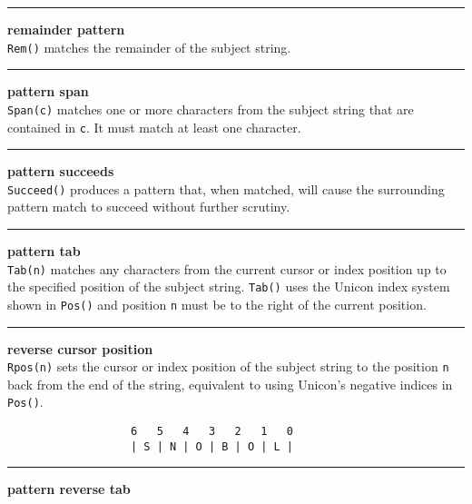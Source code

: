 \bigskip\hrule\vspace{0.1cm}
 \hfill{\bf remainder pattern}\\

\noindent
\texttt{Rem()} matches the remainder of the subject string.\\


\bigskip\hrule\vspace{0.1cm}
 \hfill{\bf pattern span}\\

\noindent
\texttt{Span(c)} matches one or more characters from the subject string that
are contained in \texttt{c}.  It must match at least one character.\\


\bigskip\hrule\vspace{0.1cm}
 \hfill{\bf pattern succeeds}\\

\noindent
\texttt{Succeed()} produces a pattern that, when matched, will cause
the surrounding pattern match to succeed without further scrutiny.\\


\bigskip\hrule\vspace{0.1cm}
 \hfill{\bf pattern tab}\\

\noindent
\texttt{Tab(n)} matches any characters from the current cursor or
index position up to
the specified position of the subject string.  \texttt{Tab()} uses the
Unicon index system shown in \texttt{Pos()} and position \texttt{n} must
be to the right of the current position.\\


\bigskip\hrule\vspace{0.1cm}
 \hfill{\bf reverse cursor position}\\

\noindent
\texttt{Rpos(n)} sets the cursor or index position of the subject string to
the position \texttt{n} back from the end of the string, equivalent to
using Unicon's negative indices in \texttt{Pos()}.
\begin{verbatim}
                   6   5   4   3   2   1   0
                   | S | N | O | B | O | L |
\end{verbatim}


\bigskip\hrule\vspace{0.1cm}
 \hfill{\bf pattern reverse tab}\\

